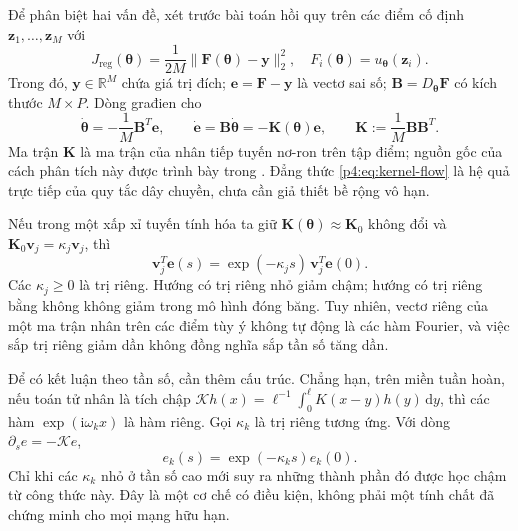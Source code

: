 Để phân biệt hai vấn đề, xét trước bài toán hồi quy trên các điểm cố
định $\mathbf{z}_1,\ldots,\mathbf{z}_M$ với
\begin{equation}
 J_{\mathrm{reg}}(\boldsymbol{\theta})
 =\frac{1}{2M}\|\mathbf{F}(\boldsymbol{\theta})-\mathbf{y}\|_2^2,
 \quad F_i(\boldsymbol{\theta})=u_{\boldsymbol{\theta}}(\mathbf{z}_i).
 \label{p4:eq:regression}
\end{equation}
Trong đó, $\mathbf{y}\in\mathbb{R}^{M}$ chứa giá trị đích;
$\mathbf{e}=\mathbf{F}-\mathbf{y}$ là vectơ sai số;
$\mathbf{B}=D_{\boldsymbol{\theta}}\mathbf{F}$ có kích thước
$M\times P$. Dòng građien cho
\begin{equation}
 \dot{\boldsymbol{\theta}}=-\frac{1}{M}\mathbf{B}^{T}\mathbf{e},
 \qquad
 \dot{\mathbf{e}}=\mathbf{B}\dot{\boldsymbol{\theta}}
 =-\mathbf{K}(\boldsymbol{\theta})\mathbf{e},
 \qquad \mathbf{K}:=\frac{1}{M}\mathbf{B}\mathbf{B}^{T}.
 \label{p4:eq:kernel-flow}
\end{equation}
Ma trận $\mathbf{K}$ là ma trận của nhân tiếp tuyến nơ-ron trên tập
điểm; nguồn gốc của cách phân tích này được trình bày trong
\cite{jacot2018}. Đẳng thức \eqref{p4:eq:kernel-flow} là hệ quả trực
tiếp của quy tắc dây chuyền, chưa cần giả thiết bề rộng vô hạn.

Nếu trong một xấp xỉ tuyến tính hóa ta giữ
$\mathbf{K}(\boldsymbol{\theta})\approx\mathbf{K}_0$ không đổi và
$\mathbf{K}_0\mathbf{v}_j=\kappa_j\mathbf{v}_j$, thì
\begin{equation}
 \mathbf{v}_j^T\mathbf{e}(s)
 =\exp(-\kappa_js)\,\mathbf{v}_j^T\mathbf{e}(0).
 \label{p4:eq:kernel-modes}
\end{equation}
Các $\kappa_j\geq0$ là trị riêng. Hướng có trị riêng nhỏ giảm chậm;
hướng có trị riêng bằng không không giảm trong mô hình đóng băng.
Tuy nhiên, vectơ riêng của một ma trận nhân trên các điểm tùy ý
không tự động là các hàm Fourier, và việc sắp trị riêng giảm dần
không đồng nghĩa sắp tần số tăng dần.

Để có kết luận theo tần số, cần thêm cấu trúc. Chẳng hạn, trên miền
tuần hoàn, nếu toán tử nhân là tích chập
$\mathcal{K}h(x)=\ell^{-1}\int_0^\ell K(x-y)h(y)\,\mathrm{d}y$,
thì các hàm $\exp(\mathrm{i}\omega_kx)$ là hàm riêng. Gọi $\kappa_k$
là trị riêng tương ứng. Với dòng $\partial_se=-\mathcal{K}e$,
\begin{equation}
 e_k(s)=\exp(-\kappa_ks)e_k(0).
 \label{p4:eq:fourier-training}
\end{equation}
Chỉ khi các $\kappa_k$ nhỏ ở tần số cao mới suy ra những thành phần
đó được học chậm từ công thức này. Đây là một cơ chế có điều kiện,
không phải một tính chất đã chứng minh cho mọi mạng hữu hạn.

